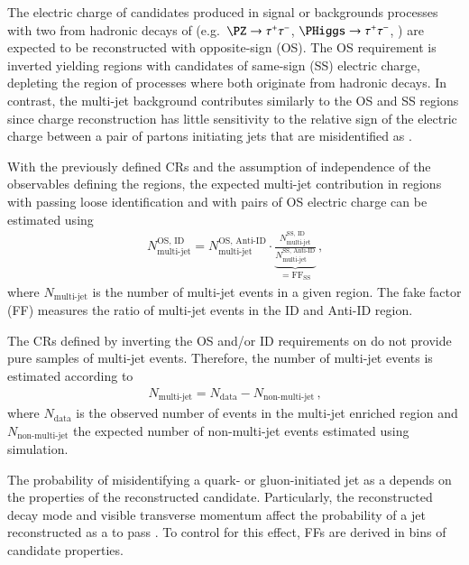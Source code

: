 The electric charge of \tauhadvis candidates produced in signal or backgrounds
processes with two \tauhadvis from hadronic decays of \tauleptons (e.g.\
$\PZ \to \tautau$, $\PHiggs \to \tautau$, \ttbar) are expected to be
reconstructed with opposite-sign (OS).\todo{Already explained (event
  selection?)} The OS requirement is inverted yielding regions with \tauhadvis
candidates of same-sign (SS) electric charge, depleting the region of processes
where both \tauhadvis originate from hadronic \taulepton decays. In contrast,
the multi-jet background contributes similarly to the OS and SS regions since
\tauhadvis charge reconstruction has little sensitivity to the relative sign of
the electric charge between a pair of partons initiating jets that are
misidentified as \tauhadvis.

With the previously defined CRs and the assumption of independence of the
observables defining the regions, the expected multi-jet contribution in regions
with \tauhadvis passing loose identification and with \tauhadvis pairs of OS
electric charge can be estimated using
\begin{align*}
  N_\text{multi-jet}^{\text{OS, ID}} =
  N_\text{multi-jet}^{\text{OS, Anti-ID}}
  \cdot
  \underbrace{\frac{N_\text{multi-jet}^{\text{SS, ID}}}
  {N_\text{multi-jet}^{\text{SS, Anti-ID}}}}
  _{= \text{FF}_{\text{SS}}} \,\text{,}
\end{align*}
where $N_\text{multi-jet}$ is the number of multi-jet events in a given
region. The fake factor (FF) measures the ratio of multi-jet events in the ID
and Anti-ID region.%

The CRs defined by inverting the OS and/or ID requirements on \tauhadvis do not
provide pure samples of multi-jet events. Therefore, the number of multi-jet
events is estimated according to
\begin{align*}
  N_\text{multi-jet} = N_\text{data} - N_\text{non-multi-jet} \,\text{,}
\end{align*}
where $N_\text{data}$ is the observed number of events in the
multi-jet enriched region and $N_\text{non-multi-jet}$ the expected
number of non-multi-jet events estimated using simulation.

The probability of misidentifying a quark- or gluon-initiated jet as a
\tauhadvis depends on the properties of the reconstructed \tauhadvis
candidate. Particularly, the reconstructed decay mode and visible transverse
momentum affect the probability of a jet reconstructed as a \tauhadvis to pass
\tauid. To control for this effect, FFs are derived in bins of \tauhadvis
candidate properties.

